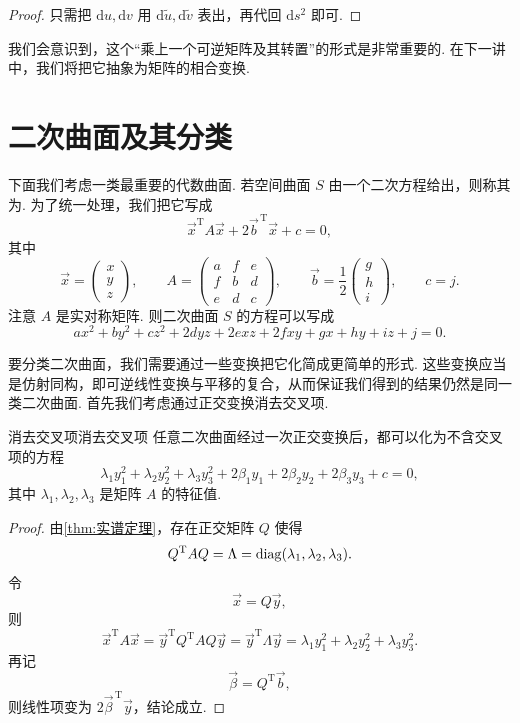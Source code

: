 \begin{proof}
    只需把 $\mathrm{d}u, \mathrm{d}v$ 用 $\mathrm{d}\tilde{u}, \mathrm{d}\tilde{v}$ 表出，再代回 $\mathrm{d}s^2$ 即可.
\end{proof}

我们会意识到，这个``乘上一个可逆矩阵及其转置''的形式是非常重要的. 在下一讲中，我们将把它抽象为矩阵的相合变换.

\section{二次曲面及其分类}

下面我们考虑一类最重要的代数曲面. 若空间曲面 $S$ 由一个二次方程给出，则称其为. 为了统一处理，我们把它写成
\[
    \vec{x}^\mathrm{T} A \vec{x} + 2 \vec{b}^{\,\mathrm{T}} \vec{x} + c = 0,
\]
其中
\[
    \vec{x} =
    \begin{pmatrix}
        x \\
        y \\
        z
    \end{pmatrix},
    \qquad
    A =
    \begin{pmatrix}
        a & f & e \\
        f & b & d \\
        e & d & c
    \end{pmatrix}, \qquad \vec{b} = \frac{1}{2}
    \begin{pmatrix}
        g \\
        h \\
        i
    \end{pmatrix},
    \qquad c = j.
\]
注意 $A$ 是实对称矩阵. 则二次曲面 $S$ 的方程可以写成
\[
    a x^2 + b y^2 + c z^2 + 2 d y z + 2 e x z + 2 f x y + g x + h y + i z + j = 0.
\]

要分类二次曲面，我们需要通过一些变换把它化简成更简单的形式. 这些变换应当是仿射同构，即可逆线性变换与平移的复合，从而保证我们得到的结果仍然是同一类二次曲面. 首先我们考虑通过正交变换消去交叉项.

\begin{theorem}{消去交叉项}{消去交叉项}
    任意二次曲面经过一次正交变换后，都可以化为不含交叉项的方程
    \[
        \lambda_1 y_1^2 + \lambda_2 y_2^2 + \lambda_3 y_3^2 + 2 \beta_1 y_1 + 2 \beta_2 y_2 + 2 \beta_3 y_3 + c = 0,
    \]
    其中 $\lambda_1, \lambda_2, \lambda_3$ 是矩阵 $A$ 的特征值.
\end{theorem}

\begin{proof}
    由\autoref{thm:实谱定理}，存在正交矩阵 $Q$ 使得
    \[
        Q^\mathrm{T} A Q = \Lambda = \operatorname{diag}(\lambda_1, \lambda_2, \lambda_3).
    \]
    令
    \[
        \vec{x} = Q \vec{y},
    \]
    则
    \[
        \vec{x}^\mathrm{T} A \vec{x}
        = \vec{y}^\mathrm{T} Q^\mathrm{T} A Q \vec{y}
        = \vec{y}^\mathrm{T} \Lambda \vec{y}
        = \lambda_1 y_1^2 + \lambda_2 y_2^2 + \lambda_3 y_3^2.
    \]
    再记
    \[
        \vec{\beta} = Q^\mathrm{T} \vec{b},
    \]
    则线性项变为 $2 \vec{\beta}^{\,\mathrm{T}} \vec{y}$，结论成立.
\end{proof}

